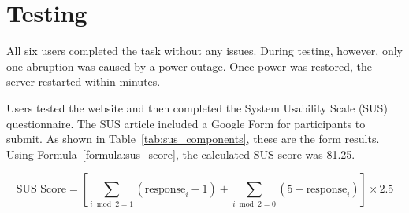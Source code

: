 

\section{Testing}

All six users completed the task without any issues. During testing, however, only one abruption was caused by a power outage. Once power was restored, the server restarted within minutes.

Users tested the website and then completed the System Usability Scale (SUS)~\autocite{SUS} questionnaire. The SUS article included a Google Form for participants to submit. As shown in Table~\ref{tab:sus_components}, these are the form results. Using Formula~\ref{formula:sus_score}, the calculated SUS score was 81.25.

\[
    \text{SUS Score} = \left[ \sum_{i \bmod 2 = 1} (\text{response}_i - 1) + \sum_{i \bmod 2 = 0} (5 - \text{response}_i) \right] \times 2.5
\]\label{formula:sus_score}

